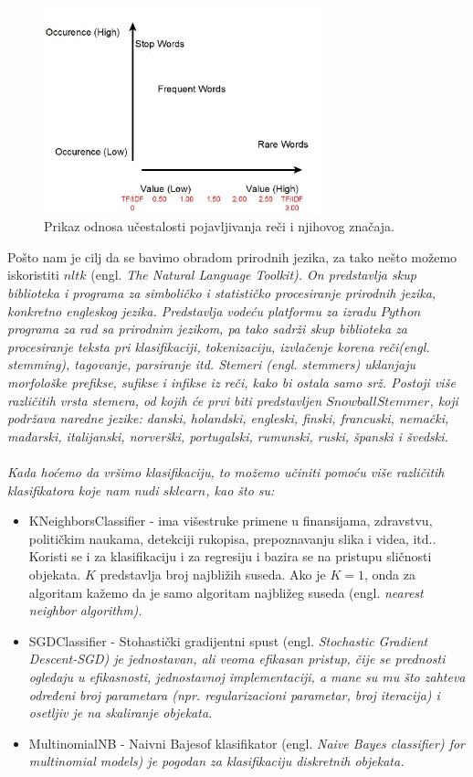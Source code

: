 \documentclass[a4paper]{article}
\begin{document}
\begin{figure}[t]
\includegraphics[width=8cm]{Pictures/slika1.png}
\centering
\caption{Prikaz odnosa učestalosti pojavljivanja reči i njihovog značaja.}
\end{figure}

Pošto nam je cilj da se bavimo obradom prirodnih jezika, za tako nešto možemo iskoristiti $nltk$ (engl. \em{The Natural Language Toolkit}). On predstavlja skup biblioteka i programa za simboličko i statističko procesiranje prirodnih jezika, konkretno engleskog jezika. Predstavlja vodeću platformu za izradu $Python$ programa za rad sa prirodnim jezikom, pa tako sadrži skup biblioteka za procesiranje teksta pri klasifikaciji, tokenizaciju, izvlačenje korena reči(engl. \em{stemming}), tagovanje, parsiranje itd. Stemeri (engl. \em{stemmers}) uklanjaju morfološke prefikse, sufikse i infikse iz reči, kako bi ostala samo srž. Postoji više različitih vrsta stemera, od kojih će prvi biti predstavljen $SnowballStemmer$, koji podržava naredne jezike: danski, holandski, engleski, finski, francuski, nemački, mađarski, italijanski, norverški, portugalski, rumunski, ruski, španski i švedski.\\\\
Kada hoćemo da vršimo klasifikaciju, to možemo učiniti pomoću više različitih klasifikatora koje nam nudi $sklearn$, kao što su:
\begin{itemize}
\item KNeighborsClassifier - ima višestruke primene u finansijama, zdravstvu, političkim naukama, detekciji rukopisa, prepoznavanju slika i videa, itd.. Koristi se i za klasifikaciju i za regresiju i bazira se na pristupu sličnosti objekata. $K$ predstavlja broj najbližih suseda. Ako je $K=1$, onda za algoritam kažemo da je samo algoritam najbližeg suseda (engl. \em{nearest neighbor algorithm}).
\item SGDClassifier - Stohastički gradijentni spust (engl. \em{Stochastic Gradient Descent-SGD}) je jednostavan, ali veoma efikasan pristup, čije se prednosti ogledaju u efikasnosti, jednostavnoj implementaciji, a mane su mu što zahteva određeni broj parametara (npr. regularizacioni parametar, broj iteracija) i osetljiv je na skaliranje objekata. 
\item MultinomialNB - Naivni Bajesof klasifikator (engl. \em{Naive Bayes classifier}) for multinomial models) je pogodan za klasifikaciju diskretnih objekata. 
\end{itemize}
\end{document}
